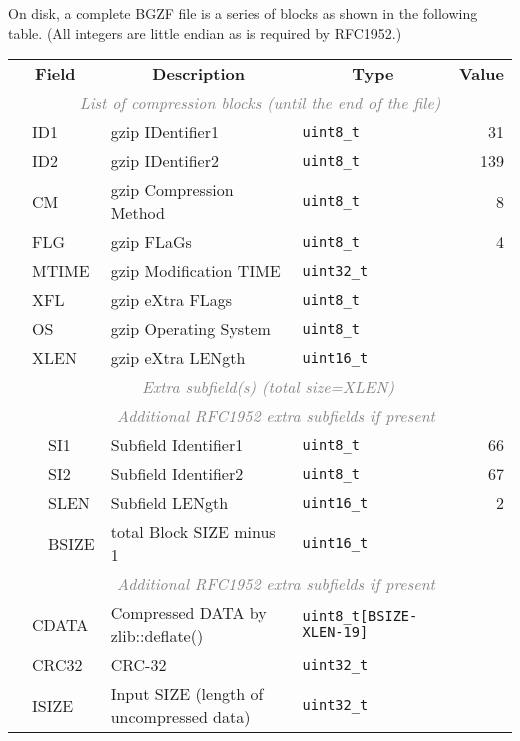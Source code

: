 \documentclass[10pt]{article}
\begin{document}
On disk, a complete BGZF file is a series of blocks as shown in the following
table.  (All integers are little endian as is required by RFC1952.)
\begin{table}[ht]
\centering
{\small
\begin{tabular}{|l|l|l|l|l|r|}
  \cline{1-6}
  \multicolumn{3}{|c|}{\bf Field} & \multicolumn{1}{c|}{\bf Description} & \multicolumn{1}{c|}{\bf Type} & \multicolumn{1}{c|}{\bf Value} \\\cline{1-6}
  \multicolumn{6}{|c|}{\textcolor{gray}{\it List of compression blocks (until the end of the file)}} \\\cline{2-6}
  & \multicolumn{2}{l|}{\sf ID1} & gzip IDentifier1 & {\tt uint8\_t} & 31 \\\cline{2-6}
  & \multicolumn{2}{l|}{\sf ID2} & gzip IDentifier2 & {\tt uint8\_t} & 139 \\\cline{2-6}
  & \multicolumn{2}{l|}{\sf CM} & gzip Compression Method & {\tt uint8\_t} & 8 \\\cline{2-6}
  & \multicolumn{2}{l|}{\sf FLG} & gzip FLaGs & {\tt uint8\_t} & 4 \\\cline{2-6}
  & \multicolumn{2}{l|}{\sf MTIME} & gzip Modification TIME & {\tt uint32\_t} & \\\cline{2-6}
  & \multicolumn{2}{l|}{\sf XFL} & gzip eXtra FLags & {\tt uint8\_t} & \\\cline{2-6}
  & \multicolumn{2}{l|}{\sf OS} & gzip Operating System & {\tt uint8\_t} & \\\cline{2-6}
  & \multicolumn{2}{l|}{\sf XLEN} & gzip eXtra LENgth & {\tt uint16\_t} & \\\cline{2-6}
  & \multicolumn{5}{c|}{\textcolor{gray}{\it Extra subfield(s) (total size=XLEN)}} \\\cline{3-6}
  & & \multicolumn{4}{c|}{\textcolor{gray}{\it Additional RFC1952 extra subfields if present}} \\\cline{3-6}
  & & {\sf SI1} & Subfield Identifier1 & {\tt uint8\_t} & 66 \\\cline{3-6}
  & & {\sf SI2} & Subfield Identifier2 & {\tt uint8\_t} & 67 \\\cline{3-6}
  & & {\sf SLEN} & Subfield LENgth & {\tt uint16\_t} & 2 \\\cline{3-6}
  & & {\sf BSIZE} & total Block SIZE minus 1 & {\tt uint16\_t} & \\\cline{3-6}
  & & \multicolumn{4}{c|}{\textcolor{gray}{\it Additional RFC1952 extra subfields if present}} \\\cline{2-6}
  & \multicolumn{2}{l|}{\sf CDATA} & Compressed DATA by {\sf zlib::deflate()} & {\tt uint8\_t[{\sf BSIZE-XLEN-19}]} & \\\cline{2-6}
  & \multicolumn{2}{l|}{\sf CRC32} & CRC-32 & {\tt uint32\_t} & \\\cline{2-6}
  & \multicolumn{2}{l|}{\sf ISIZE} & Input SIZE (length of uncompressed data) & {\tt uint32\_t} & \\
  \cline{1-6}
\end{tabular}}
\end{table}
\end{document}
